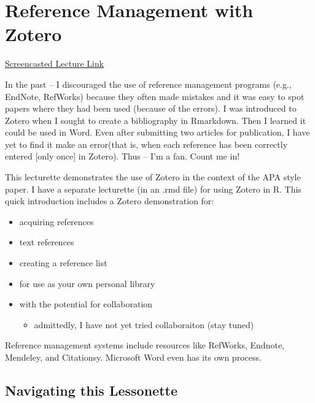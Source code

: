 \documentclass[
  english,
]{book}
\providecommand{\tightlist}{%
  \setlength{\itemsep}{0pt}\setlength{\parskip}{0pt}}
\begin{document}
\hypertarget{Zotero}{%
\chapter{Reference Management with Zotero}\label{Zotero}}

\href{HTTPS://SPU.HOSTED.PANOPTO.COM/PANOPTO/PAGES/VIEWER.ASPX?ID=CB5B69D1-EDCC-45A5-97B1-AC250189047A}{Screencasted Lecture Link}

In the past -- I discouraged the use of reference management programs (e.g., EndNote, RefWorks) because they often made mistakes and it was easy to spot papers where they had been used (because of the errors). I was introduced to Zotero when I sought to create a bibliography in Rmarkdown. Then I learned it could be used in Word. Even after submitting two articles for publication, I have yet to find it make an error(that is, when each reference has been correctly entered {[}only once{]} in Zotero). Thus -- I'm a fan. Count me in!

This lecturette demonstrates the use of Zotero in the context of the APA style paper. I have a separate lecturette (in an .rmd file) for using Zotero in R. This quick introduction includes a Zotero demonstration for:

\begin{itemize}
\tightlist
\item
  acquiring references
\item
  text references
\item
  creating a reference list
\item
  for use as your own personal library
\item
  with the potential for collaboration

  \begin{itemize}
  \tightlist
  \item
    admittedly, I have not yet tried collaboraiton (stay tuned)
  \end{itemize}
\end{itemize}

Reference management systems include resources like RefWorks, Endnote, Mendeley, and Citationsy. Microsoft Word even has its own process.

\hypertarget{navigating-this-lessonette}{%
\section{Navigating this Lessonette}\label{navigating-this-lessonette}}
\end{document}
